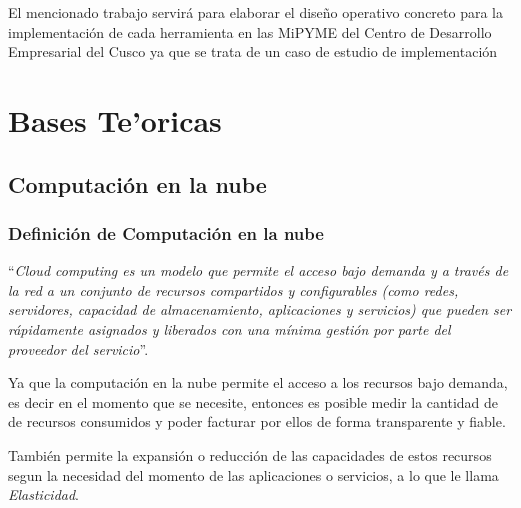 El mencionado trabajo servir\'a para elaborar el dise\~no operativo concreto para la
implementaci\'on de cada herramienta en las MiPYME del Centro de Desarrollo
Empresarial del Cusco ya que se trata de un caso de estudio de implementaci\'on

\section{Bases Te'oricas}

\subsection{Computaci\'on en la nube}

\subsubsection{Definici\'on de Computaci\'on en la nube}
``\emph{Cloud computing es un modelo que permite el acceso bajo demanda y a trav\'es de
la red a un conjunto de recursos compartidos y configurables (como redes,
servidores, capacidad de almacenamiento, aplicaciones y servicios) que pueden
ser r\'apidamente asignados y liberados con una m\'inima gesti\'on por parte del
proveedor del servicio}''\citep{cierco}.

Ya que la computaci\'on en la nube permite el acceso a los recursos bajo demanda,
es decir en el momento que se necesite, entonces es posible medir la cantidad de
de recursos consumidos y poder facturar por ellos de forma transparente y fiable.

Tambi\'en permite la expansi\'on o reducci\'on de las capacidades de estos
recursos segun la necesidad del momento de las aplicaciones o servicios, a lo
que le llama \emph{Elasticidad}.

